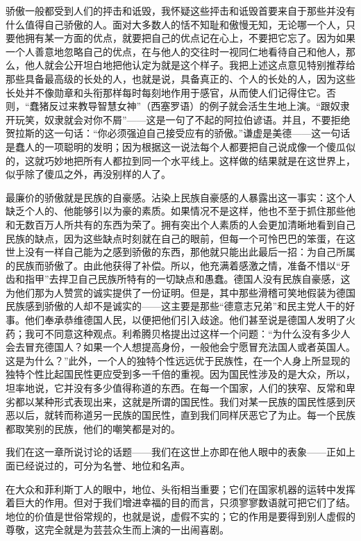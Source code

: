 \documentclass[12pt,oneside]{book}
\begin{document}
骄傲一般都受到人们的抨击和诋毁，我怀疑这些抨击和诋毁首要来自于那些并没有什么值得自己骄傲的人。面对大多数人的恬不知耻和傲慢无知，无论哪一个人，只要他拥有某一方面的优点，就要把自己的优点记在心上，不要把它忘了。因为如果一个人善意地忽略自己的优点，在与他人的交往时一视同仁地看待自己和他人，那么，他人就会公开坦白地把他认定为就是这个样子。我把上述这点意见特别推荐给那些具备最高级的长处的人，也就是说，具备真正的、个人的长处的人，因为这些长处并不像勋章和头衔那样每时每刻地作用于感官，从而使人们记得住它。否则，“蠢猪反过来教导智慧女神”（西塞罗语）的例子就会活生生地上演。“跟奴隶开玩笑，奴隶就会对你不屑”——这是一句了不起的阿拉伯谚语。并且，不要拒绝贺拉斯的这一句话：“你必须强迫自己接受应有的骄傲。”谦虚是美德——这一句话是蠢人的一项聪明的发明；因为根据这一说法每个人都要把自己说成像一个傻瓜似的，这就巧妙地把所有人都拉到同一个水平线上。这样做的结果就是在这世界上，似乎除了傻瓜之外，再没别样的人了。 

最廉价的骄傲就是民族的自豪感。沾染上民族自豪感的人暴露出这一事实：这个人缺乏个人的、他能够引以为豪的素质。如果情况不是这样，他也不至于抓住那些他和无数百万人所共有的东西为荣了。拥有突出个人素质的人会更加清晰地看到自己民族的缺点，因为这些缺点时刻就在自己的眼前，但每一个可怜巴巴的笨蛋，在这世上没有一样自己能为之感到骄傲的东西，那他就只能出此最后一招：为自己所属的民族而骄傲了。由此他获得了补偿。所以，他充满着感激之情，准备不惜以“牙齿和指甲”去捍卫自己民族所特有的一切缺点和愚蠢。德国人没有民族自豪感，这为他们那为人赞赏的诚实提供了一份证明。但是，其中那些滑稽可笑地假装为德国民族感到骄傲的人却不是诚实的——这主要是那些“德意志兄弟”和民主党人干的好事。他们奉承恭维德国人民，以便把他们引入歧途。他们甚至说是德国人发明了火药；我可不同意这种观点。利希腾贝格提出过这样一个问题：“为什么没有多少人会去冒充德国人？如果一个人想提高身份，一般他会宁愿冒充法国人或者英国人。这是为什么？”此外，一个人的独特个性远远优于民族性，在一个人身上所显现的独特个性比起国民性更应受到多一千倍的重视。因为国民性涉及的是大众，所以，坦率地说，它并没有多少值得称道的东西。在每一个国家，人们的狭窄、反常和卑劣都以某种形式表现出来，这就是所谓的国民性。我们对某一民族的国民性感到厌恶以后，就转而称道另一民族的国民性，直到我们同样厌恶它了为止。每一个民族都取笑别的民族，他们的嘲笑都是对的。 



我们在这一章所说讨论的话题——我们在这世上亦即在他人眼中的表象——正如上面已经说过的，可分为名誉、地位和名声。 

在大众和菲利斯丁人的眼中，地位、头衔相当重要；它们在国家机器的运转中发挥着巨大的作用。但对于我们增进幸福的目的而言，只须寥寥数语就可把它们了结。地位的价值是世俗常规的，也就是说，虚假不实的；它的作用是要得到别人虚假的尊敬，这完全就是为芸芸众生而上演的一出闹喜剧。
\end{document}
